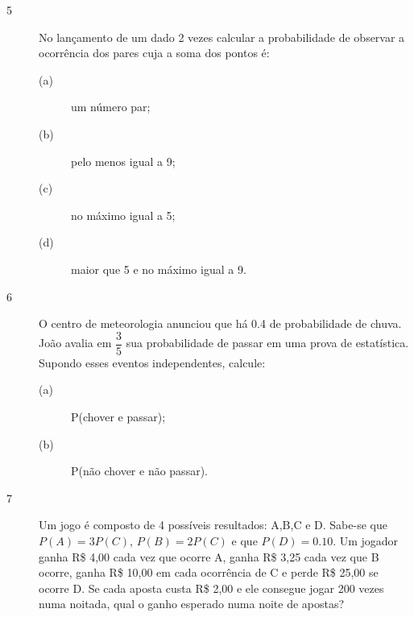 \documentclass{report}
\begin{document}
\begin{description}

\item[{\large 5}] No lançamento de um dado 2 vezes calcular a probabilidade de observar a ocorrência dos pares cuja a soma dos pontos é:

\begin{description}

\item[(a)]  { um número par;}

\item[(b)]  { pelo menos igual a 9;}

\item[(c)]  { no máximo igual a 5;}

\item[(d)]  { maior que 5 e no máximo igual a 9.}


\end{description}

\end{description}

\begin{description}

\item[{\large 6}] O centro de meteorologia anunciou que há 0.4 de probabilidade de chuva. João avalia em $\dfrac{3}{5}$ sua probabilidade de passar em uma prova de 
estatística. Supondo esses eventos independentes, calcule:

\begin{description}

\item[(a)]  { P(chover e passar);}

\item[(b)]  { P(não chover e não passar).}


\end{description}

\end{description}


\begin{description}

\item[{\large 7}] Um jogo é composto de 4 possíveis resultados: A,B,C e D. Sabe-se que $P(A) = 3P(C)$, $P(B) = 2P(C)$ e que $P(D)
=  0.10$. Um jogador  ganha R\$ 4,00 cada  vez  que  ocorre  A, ganha R\$ 3,25 cada  vez  que B ocorre, ganha R\$
10,00 em cada ocorrência de C e perde R\$ 25,00 se ocorre D. Se cada aposta custa R\$ 2,00 e ele consegue jogar
200 vezes numa noitada, qual o ganho esperado numa noite de apostas?

\end{description}
\end{document}

